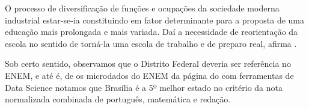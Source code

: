 O processo de diversificação de funções e ocupações da sociedade moderna
industrial estar-se-ia constituindo em fator determinante para a proposta de uma
educação mais prolongada e mais variada. Daí a necessidade de reorientação da escola
no sentido de torná-la uma escola de trabalho e de preparo real, afirma .

Sob certo sentido, observamos que o Distrito Federal deveria ser referência no ENEM, e até é, de os microdados do ENEM da página do  com ferramentas de Data Science notamos que Brasília é a 5º melhor estado no critério da nota normalizada combinada de português, matemática e redação.



